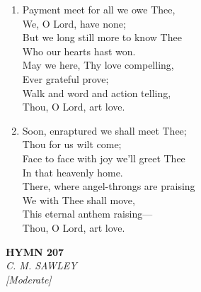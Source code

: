 \documentclass[11pt,a4paper]{article}
\begin{document}
\begin{enumerate}
    \item Payment meet for all we owe Thee, \\
            We, O Lord, have none; \\
        But we long still more to know Thee \\
            Who our hearts hast won. \\
        May we here, Thy love compelling, \\
            Ever grateful prove; \\
        Walk and word and action telling, \\
            Thou, O Lord, art love.

    \item Soon, enraptured we shall meet Thee; \\
            Thou for us wilt come; \\
        Face to face with joy we'll greet Thee \\
            In that heavenly home. \\
        There, where angel-throngs are praising \\
            We with Thee shall move, \\
        This eternal anthem raising--- \\
            Thou, O Lord, art love.

\end{enumerate}

\newpage
\begin{center}
    {\Large \textbf{HYMN 207}}
    \\
    \textit{C. M. SAWLEY}
    \\
    \textit{\small [Moderate]}
\end{center}
\vspace{1em}
\end{document}
